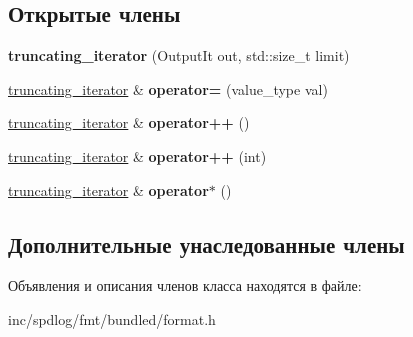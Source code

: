 \subsection*{Открытые члены}
\begin{DoxyCompactItemize}
\item 
\mbox{\label{classinternal_1_1truncating__iterator_3_01OutputIt_00_01std_1_1true__type_01_4_af78656fa13e48e2cddf4053477f5457b}} 
{\bfseries truncating\+\_\+iterator} (Output\+It out, std\+::size\+\_\+t limit)
\item 
\mbox{\label{classinternal_1_1truncating__iterator_3_01OutputIt_00_01std_1_1true__type_01_4_a3fd23f1107d8e84d5e9c307f2e187c63}} 
\hyperlink{classinternal_1_1truncating__iterator}{truncating\+\_\+iterator} \& {\bfseries operator=} (value\+\_\+type val)
\item 
\mbox{\label{classinternal_1_1truncating__iterator_3_01OutputIt_00_01std_1_1true__type_01_4_aa9fab2b005af99f4ec60189ad09b71d2}} 
\hyperlink{classinternal_1_1truncating__iterator}{truncating\+\_\+iterator} \& {\bfseries operator++} ()
\item 
\mbox{\label{classinternal_1_1truncating__iterator_3_01OutputIt_00_01std_1_1true__type_01_4_a2d7e7e795edf1078b13a728c0d6ace9e}} 
\hyperlink{classinternal_1_1truncating__iterator}{truncating\+\_\+iterator} \& {\bfseries operator++} (int)
\item 
\mbox{\label{classinternal_1_1truncating__iterator_3_01OutputIt_00_01std_1_1true__type_01_4_abe59e545d0c6bb7097296a96133f5517}} 
\hyperlink{classinternal_1_1truncating__iterator}{truncating\+\_\+iterator} \& {\bfseries operator$\ast$} ()
\end{DoxyCompactItemize}
\subsection*{Дополнительные унаследованные члены}


Объявления и описания членов класса находятся в файле\+:\begin{DoxyCompactItemize}
\item 
inc/spdlog/fmt/bundled/format.\+h\end{DoxyCompactItemize}
